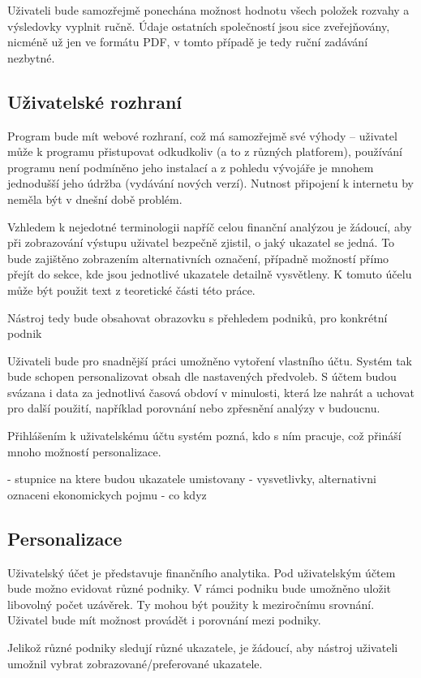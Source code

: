 Uživateli bude samozřejmě ponechána možnost hodnotu všech položek rozvahy a výsledovky vyplnit ručně. Údaje ostatních společností jsou sice zveřejňovány, nicméně už jen ve formátu PDF, v tomto případě je tedy ruční zadávání nezbytné.

\subsection{Uživatelské rozhraní}
Program bude mít webové rozhraní, což má samozřejmě své výhody -- uživatel může k programu přistupovat odkudkoliv (a to z různých platforem), používání programu není podmíněno jeho instalací a z pohledu vývojáře je mnohem jednodušší jeho údržba (vydávání nových verzí). Nutnost připojení k internetu by neměla být v dnešní době problém.

Vzhledem k nejedotné terminologii napříč celou finanční analýzou je žádoucí, aby při zobrazování výstupu uživatel bezpečně zjistil, o jaký ukazatel se jedná. To bude zajištěno zobrazením alternativních označení, případně možností přímo přejít do sekce, kde jsou jednotlivé ukazatele detailně vysvětleny. K tomuto účelu může být použit text z teoretické části této práce.

Nástroj tedy bude obsahovat obrazovku s přehledem podniků, pro konkrétní podnik 

Uživateli bude pro snadnější práci umožněno vytoření vlastního účtu. Systém tak bude schopen personalizovat obsah dle nastavených předvoleb. S účtem budou svázana i data za jednotlivá časová obdoví v minulosti, která lze nahrát a uchovat pro další použití, například porovnání nebo zpřesnění analýzy v budoucnu.

Přihlášením k uživatelskému účtu systém pozná, kdo s ním pracuje, což přináší mnoho možností personalizace.

- stupnice na ktere budou ukazatele umistovany
- vysvetlivky, alternativni oznaceni ekonomickych pojmu
- co kdyz


\subsection{Personalizace}
Uživatelský účet je představuje finančního analytika. Pod uživatelským účtem bude možno evidovat různé podniky. V rámci podniku bude umožněno uložit libovolný počet uzávěrek. Ty mohou být použity k meziročnímu srovnání.
Uživatel bude mít možnost provádět i porovnání mezi podniky.

Jelikož různé podniky sledují různé ukazatele, je žádoucí, aby nástroj uživateli umožnil vybrat zobrazované/preferované ukazatele. 

